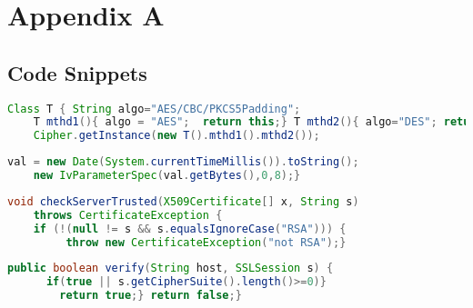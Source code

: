 \chapter{Appendix A}


\section{Code Snippets}
\label{appendixA:codesnippets}

\begin{lstlisting}[frame=tb,caption={{\small Method Chaining (\opnumber{5}).}},     label={lst:method_chain},language=java]
    Class T { String algo="AES/CBC/PKCS5Padding";
    T mthd1(){ algo = "AES";  return this;} T mthd2(){ algo="DES"; return this;} }
    Cipher.getInstance(new T().mthd1().mthd2());
    \end{lstlisting}
    \vspace{-0.25em}
    
    \begin{lstlisting}[frame=tb,caption={\small Predictable/Non-Random Derivation of Value (\opnumber{6})}, label={lst:bad_derivation_operator},language=java]
    val = new Date(System.currentTimeMillis()).toString();
    new IvParameterSpec(val.getBytes(),0,8);}
    \end{lstlisting}
    \vspace{-0.25em}
    
    \begin{lstlisting}[frame=tb,caption={{\small Exception in an {\em always-false} condition block (\opnumber{7}).}}, label={lst:conditional_exception},language=java]
    void checkServerTrusted(X509Certificate[] x, String s)
    throws CertificateException {
    if (!(null != s && s.equalsIgnoreCase("RSA"))) {
         throw new CertificateException("not RSA");}
    \end{lstlisting}
    \vspace{-0.25em}
    
    \begin{lstlisting}[frame=tb,caption={\small False return within an {\em always true} condition block (\opnumber{8}).}, label={lst:condition_return},language=java]
    public boolean verify(String host, SSLSession s) {
      if(true || s.getCipherSuite().length()>=0)}
        return true;} return false;}
    \end{lstlisting}
    \vspace{-0.25em}
    
